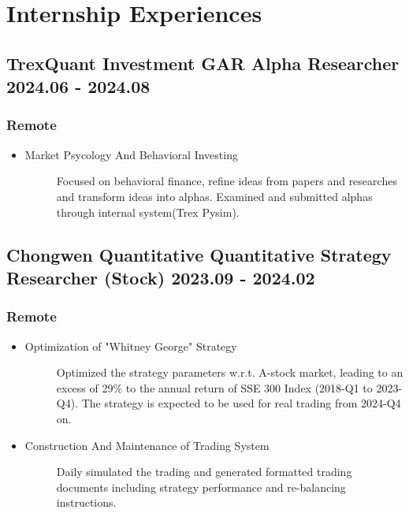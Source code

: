 \documentclass[a4paper]{article}
\begin{document}
\hypertarget{intern-exp}{
    \section{Internship Experiences}
}
\subsection{TrexQuant Investment GAR Alpha Researcher 2024.06 - 2024.08}
\subsubsection{Remote}
\begin{itemize}
    \item\begin{description}
        \item[Market Psycology And Behavioral Investing] Focused on behavioral finance, refine ideas from papers and researches and transform ideas into alphas. Examined and submitted alphas through internal system(Trex Pysim).
    \end{description}
\end{itemize}

\subsection{Chongwen Quantitative \normalfont\hfill Quantitative Strategy Researcher (Stock) \hfill 2023.09 - 2024.02}
\subsubsection{Remote}
\begin{itemize}%
    \item \begin{description}
        \item[Optimization of "Whitney George" Strategy] 
        Optimized the strategy parameters w.r.t. A-stock market, leading to an excess of 29\% to the annual return of SSE 300 Index (2018-Q1 to 2023-Q4). The strategy is expected to be used for real trading from 2024-Q4 on.
    \end{description}
    \item \begin{description}
        \item[Construction And Maintenance of Trading System] 
        Daily simulated the trading and generated formatted trading documents including strategy performance and re-balancing instructions.
    \end{description}
\end{itemize}
\end{document}
